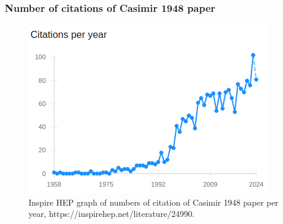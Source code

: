 \documentclass[10pt,t]{beamer}
\begin{document}
\begin{frame}
  \frametitle{Number of citations of Casimir 1948 paper}


  \begin{figure}

    \label{fig:Casimir-paper-citations}

    \centering


    \includegraphics[scale=0.6]
    {./Presentation-pictures/Casimir-paper-citations.png}

    \caption{Inspire HEP graph of numbers of citation of Casimir 1948 paper
      per year, 
      {https://inspirehep.net/literature/24990}.}


  \end{figure}

\end{frame}
\end{document}
